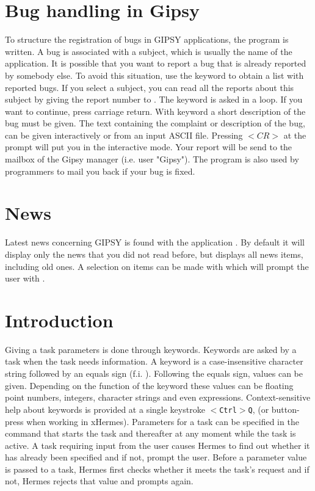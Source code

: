 \section{Bug handling in Gipsy}

To structure the registration of bugs in GIPSY applications, the
program  is written. 
A bug is associated with a subject, which is usually the name of
the application. It is possible that you want to report a bug that
is already reported by somebody else. To avoid this situation, use
the keyword  to obtain a list with reported bugs.
If you select a subject, you can read all the reports about this
subject by giving the report number to . The keyword
is asked in a loop. If you want to continue, press carriage return.
With keyword  a short description of the bug must
be given. The text containing the complaint or description of the 
bug, can be given interactively or from an input ASCII file. Pressing
$<CR>$ at the  prompt will put you in the interactive 
mode. Your report will be send to the mailbox of the Gipsy manager
(i.e. user "Gipsy"). The program  is also used by programmers 
to mail you back if your bug is fixed.

\section{News}
Latest news concerning GIPSY is found with the application .
By default it will display only the news that you did not read before, 
but  displays all news items, including old ones. 
A selection on items can be made with  which
will prompt the user with .


\label{chapter:inpsyntax}

\section{Introduction}

Giving a task parameters is done through keywords. Keywords are asked by a task
when the task needs information. A keyword is a case-insensitive character 
string followed by an equals sign (f.i. ). Following the equals 
sign, values can be given.
Depending on the function of the keyword these values can be floating point 
numbers, integers, character strings and even expressions. Context-sensitive 
help about keywords is provided at a single keystroke {\tt $<$Ctrl$>$Q},
(or button-press when working in xHermes).
Parameters for a task can be specified in the command that starts the task and
thereafter at any moment while the task is active.
A task requiring input from the user causes Hermes to find out whether it has
already been specified and if not, prompt the user.
Before a parameter value is passed to a task, Hermes first checks whether it
meets the task's request and if not, Hermes rejects that value and prompts 
again.


